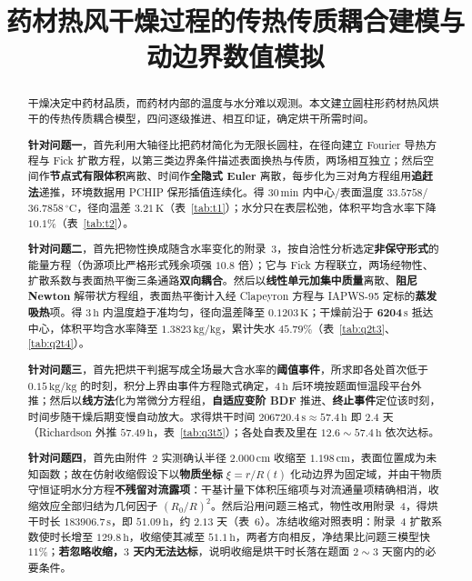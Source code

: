 \documentclass[withoutpreface,bwprint]{cumcmthesis} %
\title{药材热风干燥过程的传热传质耦合建模与动边界数值模拟} %
\begin{document}
 \maketitle

  \begin{abstract}
 干燥决定中药材品质，而药材内部的温度与水分难以观测。本文建立圆柱形药材热风烘干的传热传质耦合模型，四问逐级推进、相互印证，确定烘干所需时间。

 \textbf{针对问题一}，首先利用大轴径比把药材简化为无限长圆柱，在径向建立 Fourier 导热方程与 Fick 扩散方程，以第三类边界条件描述表面换热与传质，两场相互独立；然后空间作\textbf{节点式有限体积}离散、时间作\textbf{全隐式 Euler} 离散，每步化为三对角方程组用\textbf{追赶法}递推，环境数据用 PCHIP 保形插值连续化。得 $30\,\mathrm{min}$ 内中心/表面温度 $\mathbf{33.5758}$/$\mathbf{36.7858}\,^\circ\mathrm{C}$，径向温差 $\mathbf{3.21}\,\mathrm{K}$（表~\ref{tab:t1}）；水分只在表层松弛，体积平均含水率下降 $\mathbf{10.1\%}$（表~\ref{tab:t2}）。

 \textbf{针对问题二}，首先把物性换成随含水率变化的附录~3，按自洽性分析选定\textbf{非保守形式}的能量方程（伪源项比严格形式残余项强 $10.8$ 倍）；它与 Fick 方程联立，两场经物性、扩散系数与表面热平衡三条通路\textbf{双向耦合}。然后以\textbf{线性单元加集中质量}离散、\textbf{阻尼 Newton} 解带状方程组，表面热平衡计入经 Clapeyron 方程与 IAPWS-95 定标的\textbf{蒸发吸热}项。得 $3\,\mathrm{h}$ 内温度趋于准均匀，径向温差降至 $\mathbf{0.1203}\,\mathrm{K}$；干燥前沿于 $\mathbf{6204}\,\mathrm{s}$ 抵达中心，体积平均含水率降至 $\mathbf{1.3823}\,\mathrm{kg/kg}$，累计失水 $\mathbf{45.79\%}$（表~\ref{tab:q2t3}、\ref{tab:q2t4}）。

 \textbf{针对问题三}，首先把烘干判据写成全场最大含水率的\textbf{阈值事件}，所求即各处首次低于 $0.15\,\mathrm{kg/kg}$ 的时刻，积分上界由事件方程隐式确定，$4\,\mathrm{h}$ 后环境按题面恒温段平台外推；然后以\textbf{线方法}化为常微分方程组，\textbf{自适应变阶 BDF} 推进、\textbf{终止事件}定位该时刻，时间步随干燥后期变慢自动放大。求得烘干时间 $\mathbf{206720.4}\,\mathrm{s}\approx\mathbf{57.4}\,\mathrm{h}$ 即 $2.4$ 天（Richardson 外推 $\mathbf{57.49}\,\mathrm{h}$，表~\ref{tab:q3t5}）；各处自表及里在 $12.6\sim57.4\,\mathrm{h}$ 依次达标。

 \textbf{针对问题四}，首先由附件~2 实测确认半径 $2.000\,\mathrm{cm}$ 收缩至 $1.198\,\mathrm{cm}$，表面位置成为未知函数；故在仿射收缩假设下以\textbf{物质坐标} $\xi=r/R(t)$ 化动边界为固定域，并由干物质守恒证明水分方程\textbf{不残留对流露项}：干基计量下体积压缩项与对流通量项精确相消，收缩效应全部归结为几何因子 $(R_0/R)^2$。然后沿用问题三格式，物性改用附录~4，得烘干时长 $\mathbf{183906.7}\,\mathrm{s}$，即 $\mathbf{51.09}\,\mathrm{h}$，约 $\mathbf{2.13}$ 天（表~6）。冻结收缩对照表明：附录~4 扩散系数使时长增至 $129.8\,\mathrm{h}$，收缩使其减至 $51.1\,\mathrm{h}$，两者方向相反，净结果比问题三模型快 $11\%$；\textbf{若忽略收缩，$3$ 天内无法达标}，说明收缩是烘干时长落在题面 $2\sim3$ 天窗内的必要条件。


\end{abstract}
\end{document}

